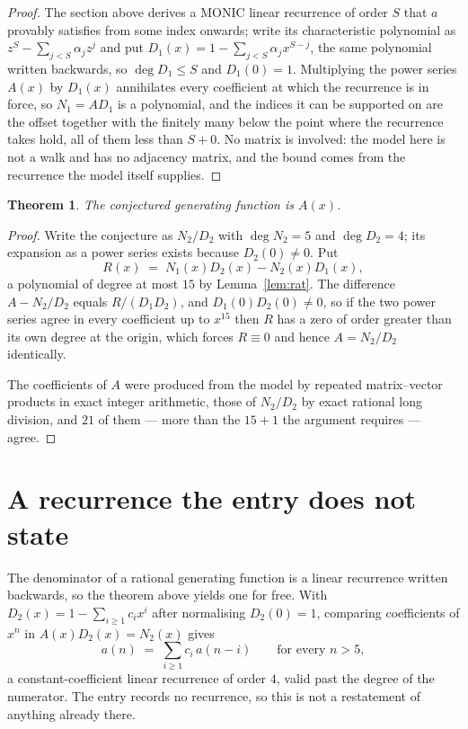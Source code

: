 \documentclass[11pt,a4paper]{article}
\theoremstyle{plain}
\newtheorem{theorem}{Theorem}
\theoremstyle{definition}
\begin{document}
\begin{proof}
The section above derives a MONIC linear recurrence of order $S$ that $a$ provably satisfies
from some index onwards; write its characteristic polynomial as $z^S-\sum_{j<S}\alpha_jz^j$
and put $D_1(x)=1-\sum_{j<S}\alpha_jx^{S-j}$, the same polynomial written backwards, so
$\deg D_1\le S$ and $D_1(0)=1$. Multiplying the power series $A(x)$ by $D_1(x)$ annihilates
every coefficient at which the recurrence is in force, so $N_1=AD_1$ is a polynomial, and the
indices it can be supported on are the offset together with the finitely many below the point
where the recurrence takes hold, all of them less than $S+0$. No matrix is involved: the
model here is not a walk and has no adjacency matrix, and the bound comes from the recurrence
the model itself supplies.
\end{proof}

\begin{theorem}
The conjectured generating function is $A(x)$.
\end{theorem}

\begin{proof}
Write the conjecture as $N_2/D_2$ with $\deg N_2=5$ and $\deg D_2=4$; its expansion as a
power series exists because $D_2(0)\neq0$. Put
\[
R(x)\;=\;N_1(x)D_2(x)-N_2(x)D_1(x),
\]
a polynomial of degree at most $15$ by Lemma~\ref{lem:rat}. The difference
$A-N_2/D_2$ equals $R/(D_1D_2)$, and $D_1(0)D_2(0)\neq0$, so if the two power series agree in
every coefficient up to $x^{15}$ then $R$ has a zero of order greater than its own
degree at the origin, which forces $R\equiv0$ and hence $A=N_2/D_2$ identically.

The coefficients of $A$ were produced from the model by repeated matrix--vector products in
exact integer arithmetic, those of $N_2/D_2$ by exact rational long division, and $21$
of them --- more than the $15+1$ the argument requires --- agree.
\end{proof}

\section{A recurrence the entry does not state}

The denominator of a rational generating function is a linear recurrence written backwards, so
the theorem above yields one for free. With $D_2(x)=1-\sum_{i\ge1}c_ix^i$ after normalising
$D_2(0)=1$, comparing coefficients of $x^n$ in $A(x)D_2(x)=N_2(x)$ gives
\[
a(n)\;=\;\sum_{i\ge1}c_i\,a(n-i)\qquad\text{for every }n>5,
\]
a constant-coefficient linear recurrence of order $4$, valid past the degree of the
numerator. The entry records no recurrence, so this is not a restatement of anything
already there.
\end{document}
